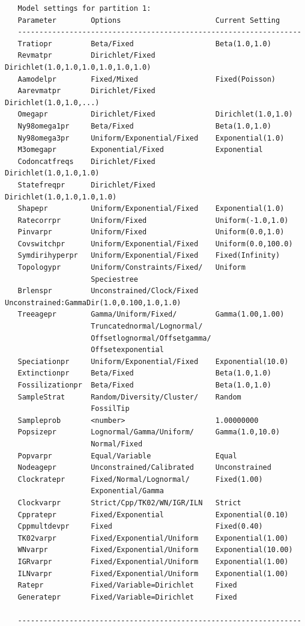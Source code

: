 \documentclass[12pt]{book}
\begin{document}
\begin{singlespacing}
\scriptsize
\begin{verbatim}
   Model settings for partition 1:
   Parameter        Options                      Current Setting
   ------------------------------------------------------------------
   Tratiopr         Beta/Fixed                   Beta(1.0,1.0)
   Revmatpr         Dirichlet/Fixed              Dirichlet(1.0,1.0,1.0,1.0,1.0,1.0)
   Aamodelpr        Fixed/Mixed                  Fixed(Poisson)
   Aarevmatpr       Dirichlet/Fixed              Dirichlet(1.0,1.0,...)
   Omegapr          Dirichlet/Fixed              Dirichlet(1.0,1.0)
   Ny98omega1pr     Beta/Fixed                   Beta(1.0,1.0)
   Ny98omega3pr     Uniform/Exponential/Fixed    Exponential(1.0)
   M3omegapr        Exponential/Fixed            Exponential
   Codoncatfreqs    Dirichlet/Fixed              Dirichlet(1.0,1.0,1.0)
   Statefreqpr      Dirichlet/Fixed              Dirichlet(1.0,1.0,1.0,1.0)
   Shapepr          Uniform/Exponential/Fixed    Exponential(1.0)
   Ratecorrpr       Uniform/Fixed                Uniform(-1.0,1.0)
   Pinvarpr         Uniform/Fixed                Uniform(0.0,1.0)
   Covswitchpr      Uniform/Exponential/Fixed    Uniform(0.0,100.0)
   Symdirihyperpr   Uniform/Exponential/Fixed    Fixed(Infinity)
   Topologypr       Uniform/Constraints/Fixed/   Uniform
                    Speciestree
   Brlenspr         Unconstrained/Clock/Fixed    Unconstrained:GammaDir(1.0,0.100,1.0,1.0)
   Treeagepr        Gamma/Uniform/Fixed/         Gamma(1.00,1.00)
                    Truncatednormal/Lognormal/
                    Offsetlognormal/Offsetgamma/
                    Offsetexponential
   Speciationpr     Uniform/Exponential/Fixed    Exponential(10.0)
   Extinctionpr     Beta/Fixed                   Beta(1.0,1.0)
   Fossilizationpr  Beta/Fixed                   Beta(1.0,1.0)
   SampleStrat      Random/Diversity/Cluster/    Random
                    FossilTip
   Sampleprob       <number>                     1.00000000
   Popsizepr        Lognormal/Gamma/Uniform/     Gamma(1.0,10.0)
                    Normal/Fixed
   Popvarpr         Equal/Variable               Equal
   Nodeagepr        Unconstrained/Calibrated     Unconstrained
   Clockratepr      Fixed/Normal/Lognormal/      Fixed(1.00)
                    Exponential/Gamma
   Clockvarpr       Strict/Cpp/TK02/WN/IGR/ILN   Strict
   Cppratepr        Fixed/Exponential            Exponential(0.10)
   Cppmultdevpr     Fixed                        Fixed(0.40)
   TK02varpr        Fixed/Exponential/Uniform    Exponential(1.00)
   WNvarpr          Fixed/Exponential/Uniform    Exponential(10.00)
   IGRvarpr         Fixed/Exponential/Uniform    Exponential(1.00)
   ILNvarpr         Fixed/Exponential/Uniform    Exponential(1.00)
   Ratepr           Fixed/Variable=Dirichlet     Fixed
   Generatepr       Fixed/Variable=Dirichlet     Fixed

   ------------------------------------------------------------------
\end{verbatim}
\normalsize
\end{singlespacing}
\end{document}
